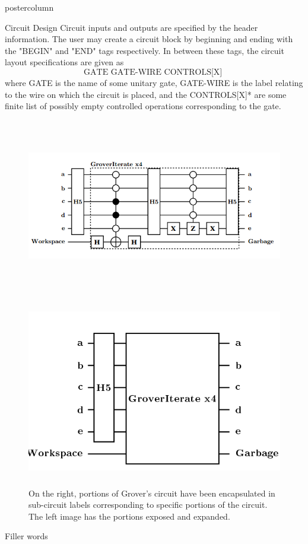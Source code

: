 \documentclass[final]{beamer} %
\begin{document}
\begin{frame}{}
\begin{columns}
\begin{column}{.33\textwidth}
\begin{beamercolorbox}[center,wd=\textwidth]{postercolumn}
\begin{minipage}[T]{.95\textwidth}
\begin{block}{\large Circuit Design}
                Circuit inputs and outputs are specified by the header information. 
                The user may create a circuit block by beginning and ending with the "BEGIN" and "END" tags respectively. 
                In between these tags, the circuit layout specifications are given as
                \[ \text{GATE \ GATE-WIRE \ CONTROLS[X] } \]
                where GATE is the name of some unitary gate, GATE-WIRE is the label relating to the wire on which the circuit is placed, and the CONTROLS[X]* are some finite list of possibly empty controlled operations corresponding to the gate.
                \begin{figure}[!htbp]
		            \centering
		            \includegraphics[height=3in]{figures/Grover_Loop.png} \ \ \ \ \includegraphics[height=3in]{figures/Grover_Roll.png} 
		            \caption{On the right, portions of Grover's circuit have been encapsulated in sub-circuit labels corresponding to specific portions of the circuit. The left image has the portions exposed and expanded.}
		        \end{figure}
	    Filler words
		        \begin{figure}[!htbp]

\end{figure}
\end{block}
\end{minipage}
\end{beamercolorbox}
\end{column}
\end{columns}
\end{frame}
\end{document}
